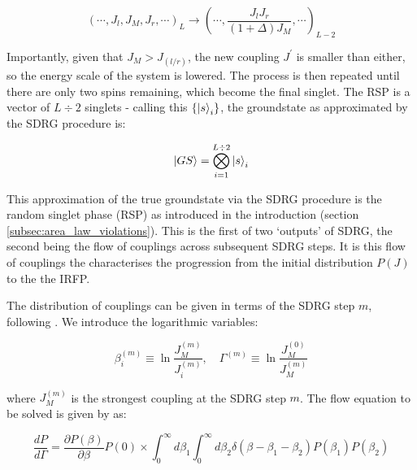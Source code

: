 \begin{equation}\label{eq:sdrg_flow}
\left(\cdots, J_{l}, J_{M}, J_{r}, \cdots\right)_{L} \rightarrow\left(\cdots, \frac{J_{l} J_{r}}{(1 + \Delta) J_{M}}, \cdots\right)_{L-2}
\end{equation}

Importantly, given that $J_M > J_{(l/r)}$, the new coupling $J^\prime$ is smaller than either, so the energy scale of the system is lowered. The process is then repeated until there are only two spins remaining, which become the final singlet. The RSP is a vector of $L \div 2$ singlets - calling this $\{\ket{s}_i\}$, the groundstate as approximated by the SDRG procedure is:

\begin{equation}\label{eq:groundstate}
	\ket{GS} = \bigotimes_{i = 1}^{L \div 2} \ket{s}_i
\end{equation} 

This approximation of the true groundstate via the SDRG procedure is the random singlet phase (RSP) as introduced in the introduction (section \ref{subsec:area_law_violations}). This is the first of two `outputs' of SDRG, the second being the flow of couplings across subsequent SDRG steps. It is this flow of couplings the characterises the progression from the initial distribution $P(J)$ to the the IRFP.

The distribution of couplings can be given in terms of the SDRG step $m$, following \cite{Fisher1994}. We introduce the logarithmic variables:

\begin{equation}\label{eq:flow_varibles}
\beta_{i}^{(m)} \equiv \ln \frac{J_{M}^{(m)}}{J_{i}^{(m)}}, \quad \Gamma^{(m)} \equiv \ln \frac{J_{M}^{(0)}}{J_{M}^{(m)}}
\end{equation}

where $J_M^{(m)}$ is the strongest coupling at the SDRG step $m$. The flow equation to be solved is given by \cite{Fisher1994} as:

\begin{equation}\label{eq:flow_equation}
\frac{d P}{d \Gamma}=\frac{\partial P(\beta)}{\partial \beta} P(0) \times \int_{0}^{\infty} d \beta_{1} \int_{0}^{\infty} d \beta_{2} \delta\left(\beta-\beta_{1}-\beta_{2}\right) P\left(\beta_{1}\right) P\left(\beta_{2}\right)
\end{equation}

